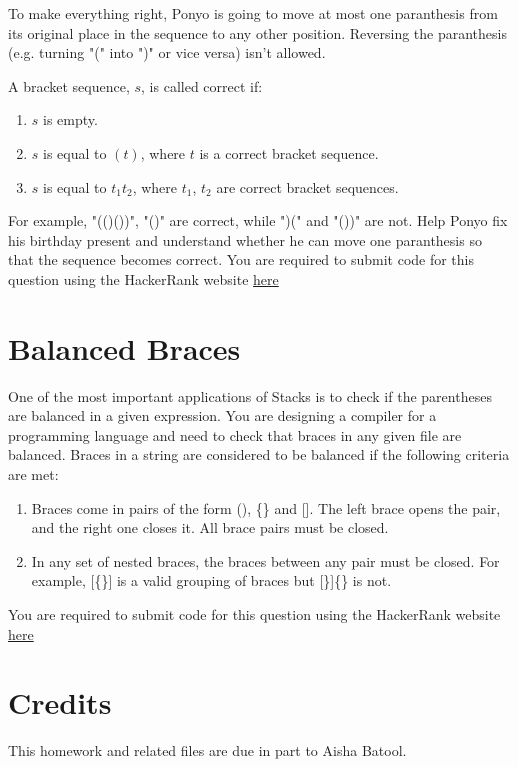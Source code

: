 \documentclass[addpoints]{exam}
\begin{document}
	To make everything right, Ponyo is going to move at most one paranthesis from its original place in the sequence to any other position. Reversing the paranthesis (e.g. turning "(" into ")" or vice versa) isn't allowed.
	
	A bracket sequence, $s$, is called correct if:
	
	\begin{enumerate}
		\item $s$ is empty.
		\item $s$ is equal to $(t)$, where $t$ is a correct bracket sequence.
		\item $s$ is equal to $t_1t_2$, where $t_1$, $t_2$ are correct bracket sequences.
	\end{enumerate}
	
	For example, "(()())", "()" are correct, while ")(" and "())" are not. Help Ponyo fix his birthday present and understand whether he can move one paranthesis so that the sequence becomes correct. You are required to submit code for this question using the HackerRank website \href{https://hr.gs/hw1_cs102}{here}
	
	\section{Balanced Braces}
	One of the most important applications of Stacks is to check if the parentheses are balanced in a given expression. You are designing a compiler for a programming language and need to check that braces in any given file are balanced. Braces in a string are considered to be balanced if the following criteria are met:
	\begin{enumerate}
		\item Braces come in pairs of the form (), \{\} and [].  The left brace opens the pair, and the right one closes it. All brace pairs must be closed.
		
		\item In any set of nested braces, the braces between any pair must be closed. For example, [\{\}] is a valid grouping of braces but [\}]\{\} is not.
		
	\end{enumerate}
	
	You are required to submit code for this question using the HackerRank website \href{https://hr.gs/hw1_cs102}{here}
	
	\section*{Credits}
	
	This homework and related files are due in part to Aisha Batool.
	
\end{document}
